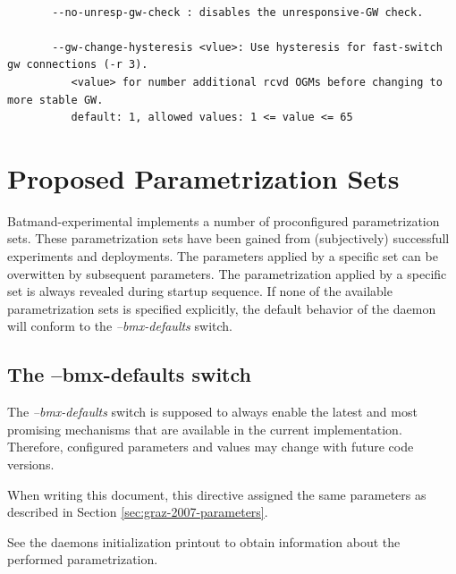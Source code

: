 \documentclass[11pt]{article}
\begin{document}
\begin{small} \begin{verbatim}

       --no-unresp-gw-check : disables the unresponsive-GW check.

       --gw-change-hysteresis <vlue>: Use hysteresis for fast-switch gw connections (-r 3).
          <value> for number additional rcvd OGMs before changing to more stable GW.
          default: 1, allowed values: 1 <= value <= 65

\end{verbatim} \end{small}






\section{Proposed Parametrization Sets}
\label{sec:proposed-parametrizations}

Batmand-experimental implements a number of proconfigured parametrization sets.
These parametrization sets have been gained from (subjectively) successfull experiments and deployments.
The parameters applied by a specific set can be overwitten by subsequent parameters.
The parametrization applied by a specific set is always revealed during startup sequence.
If none of the available parametrization sets is specified explicitly, the default behavior of the daemon will conform to the \emph{--bmx-defaults} switch.

\subsection{The --bmx-defaults switch}
\label{sec:bmx-defaults}

The \emph{--bmx-defaults} switch is supposed to always enable the latest and most promising mechanisms that are available in the current implementation.
%
Therefore, configured parameters and values may change with future code versions.

When writing this document, this directive assigned the same parameters as described in Section \ref{sec:graz-2007-parameters}.

See the daemons initialization printout to obtain information about the performed parametrization.
\end{document}
